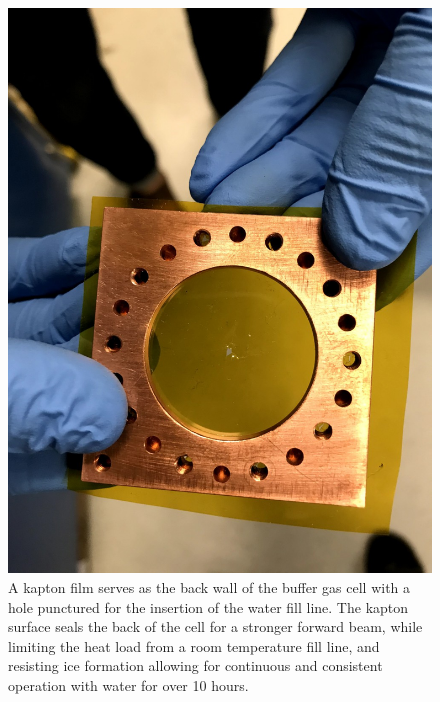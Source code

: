 \begin{figure}[H]
	\centering
	\includegraphics[width=.7\textwidth]{images/CBGB_kapton.jpg}
	\caption{A kapton film serves as the back wall of the buffer gas cell with a hole punctured for the insertion of the water fill line. The kapton surface seals the back of the cell for a stronger forward beam, while limiting the heat load from a room temperature fill line, and resisting ice formation allowing for continuous and consistent operation with water for over 10 hours.}
	\label{fig: kapton film}
\end{figure}